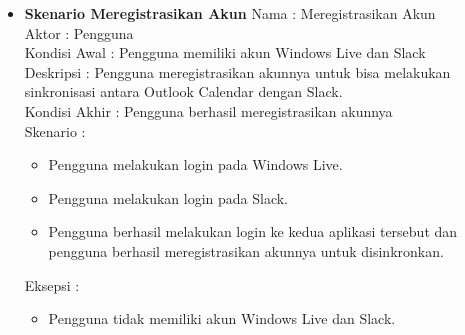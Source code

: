 \begin{itemize}
    \item \textbf{Skenario Meregistrasikan Akun}
    Nama : Meregistrasikan Akun\\
    Aktor : Pengguna\\
    Kondisi Awal : Pengguna memiliki akun Windows Live dan Slack\\
    Deskripsi : Pengguna meregistrasikan akunnya untuk bisa melakukan sinkronisasi antara Outlook Calendar dengan Slack.\\
    Kondisi Akhir : Pengguna berhasil meregistrasikan akunnya\\
    Skenario : 
    \begin{itemize}
        \item Pengguna melakukan login pada Windows Live. 
        \item Pengguna melakukan login pada Slack. 
        \item Pengguna berhasil melakukan login ke kedua aplikasi tersebut dan pengguna berhasil meregistrasikan akunnya untuk disinkronkan. 
    \end{itemize}
    Eksepsi : 
    \begin{itemize}
        \item Pengguna tidak memiliki akun Windows Live dan Slack. 
    \end{itemize}
    
\end{itemize}
\clearpage


